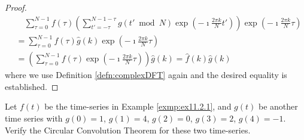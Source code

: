 \begin{proof}
\begin{align*}
&\quad \sum_{\tau=0}^{N-1} f(\tau) \left(\sum_{t'=-\tau}^{N-1-\tau} g(t' \bmod N) \exp(-\imath\frac{2\pi k}{N}t')\right) \exp(-\imath\frac{2\pi k}{N}\tau) \\
&= \sum_{\tau=0}^{N-1} f(\tau) \hat{g}(k) \exp(-\imath\frac{2\pi k}{N}\tau) \\
&= \left(\sum_{\tau=0}^{N-1} f(\tau) \exp(-\imath\frac{2\pi k}{N}\tau)\right) \hat{g}(k) = \hat{f}(k)\hat{g}(k)
\end{align*}
where we use Definition \ref{defn:complexDFT} again and the desired equality is established.
\end{proof}

\begin{exmp}
Let $f(t)$ be the time-series in Example \ref{exmp:ex11.2.1}, and $g(t)$ be another time series with $g(0) = 1$, $g(1) = 4$, $g(2) = 0$, $g(3) = 2$, $g(4) = -1$. Verify the Circular Convolution Theorem for these two time-series.
\end{exmp}
